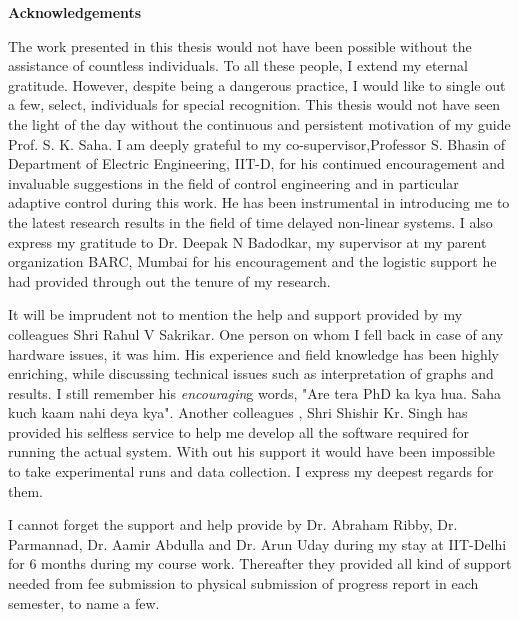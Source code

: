 \doublespacing
\newpage
\thispagestyle{empty}
\mbox{}

\newpage
\thispagestyle{empty}

\begin{center}
\textbf{\Large{Acknowledgements}}
\bigskip
\bigskip
\end{center}

The work presented in this thesis would not have been possible without the assistance
of countless individuals.  To all these people, I extend my eternal gratitude. However, despite being a dangerous practice, I would like to single out a few, select, individuals for special recognition. This thesis would not have seen the light of the day without the continuous and persistent motivation of my guide Prof. S. K. Saha.    
I am deeply grateful to my co-supervisor,Professor S. Bhasin of Department of Electric Engineering, IIT-D, for his continued encouragement and invaluable suggestions in the field of control engineering and in particular adaptive control during this work. He has been instrumental in introducing me to the latest research results  in the field of time delayed non-linear systems.  
I also express my gratitude to Dr. Deepak N Badodkar, my supervisor at my parent organization BARC, Mumbai for his encouragement and the logistic support he had provided through out the tenure of my research.   


It will be imprudent not to mention the help and support provided by my colleagues Shri Rahul V Sakrikar. One person on whom I fell back in case of any hardware issues, it was him. His experience and field knowledge has been highly enriching,  while discussing technical issues such as  interpretation of graphs and results. I still remember his \textit{encouragin}g words, "Are tera PhD ka kya hua. Saha kuch kaam nahi deya kya". Another colleagues , Shri Shishir Kr. Singh has provided his selfless service to help me develop all the software required for running the actual system. With out his support it would have been impossible to take experimental runs and data collection. I express my deepest regards for them.

I cannot forget the support and help provide by Dr. Abraham Ribby, Dr. Parmannad, Dr. Aamir Abdulla and Dr. Arun Uday during my stay at IIT-Delhi for 6 months during  my course work. Thereafter they provided all kind of support needed from fee submission to physical submission of progress report in each semester, to name a few.  


